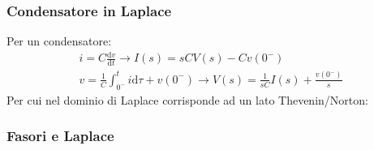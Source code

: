 \documentclass{article}
\newcommand{\df}{\mathrm{d}}
\numberwithin{equation}{subsection}
\begin{document}
\subsubsection{Condensatore in Laplace}
Per un condensatore:
\begin{gather}
    i=\displaystyle C\frac{\df v}{\df t}\to I(s)=sCV(s)-Cv(0^-)\\
    v=\displaystyle\frac{1}{C}\int_{0^-}^ti\df\tau+v(0^-)\to V(s)=\frac{1}{sC}I(s)+\frac{v(0^-)}{s}
\end{gather}
Per cui nel dominio di Laplace corrisponde ad un lato Thevenin/Norton:
\begin{figure}[H]%
    \centering
    \qquad
    \qquad
    \label{fig:condensatore-tempo-laplace}
\end{figure}

\subsubsection{Fasori e Laplace}
\end{document}
